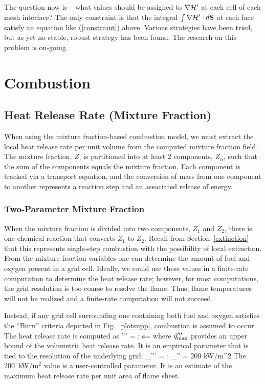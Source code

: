 \documentclass[11pt]{book}
\begin{document}
The question now is -- what values should be assigned to $\nabla {\cal H}'$ at each cell of each mesh interface?
The only constraint is that the
integral $\int \nabla {\cal H}' \cdot d{\bf S}$ at each face satisfy an equation like (\ref{constraint}) above. Various strategies
have been tried, but as yet no stable, robust strategy has been found. The research on this problem is on-going.




\clearpage
\section{Combustion}

\subsection{Heat Release Rate (Mixture Fraction)}


When using the mixture fraction-based combustion model, we must extract the local heat release rate per unit
volume from the computed mixture
fraction field. The mixture fraction, $Z$, is partitioned into at least 2 components, $Z_\alpha$, such that the
sum of the components equals the mixture
fraction. Each component is tracked via a transport equation, and the conversion of mass from one
component to another represents a reaction step and an associated release of energy.


\subsubsection{Two-Parameter Mixture Fraction}

When the mixture fraction is divided into two components, $Z_1$ and $Z_2$, there is one chemical
reaction that converts $Z_1$ to $Z_2$.  Recall from Section~\ref{extinction}
that this represents single-step combustion with the possibility of local extinction.  From the mixture fraction
variables one can determine the amount of fuel and oxygen present in a grid cell.  Ideally, we could use these values
in a finite-rate computation to determine the heat release rate; however, for most computations, the
grid resolution is too coarse to resolve the flame.  Thus, flame temperatures will not be realized and a
finite-rate computation will not succeed.

Instead, if any grid cell surrounding one containing both fuel and oxygen satisfies the ``Burn'' criteria depicted in Fig.~\ref{plotsupp},
combustion is assumed to occur.  The heat release rate is computed as
\be \dq''' = \min {}
  \quad ; \quad s=   \ee
where $\dot{q}_{\max}'''$ provides an upper bound of the volumetric heat release rate.
It is an empirical parameter that is tied to the resolution of the
underlying grid:
\be \dq_{\max}''' =   \quad ; \quad  \dq_{\max}'' = 200 \; \; \hbox{kW/m}^2  \ee
The 200~kW/m$^2$ value is a user-controlled parameter.  It is an estimate of the maximum heat release rate per unit area of flame sheet.
\end{document}
